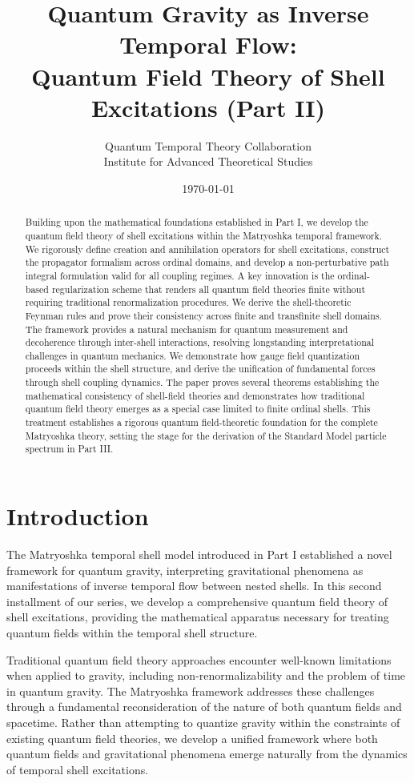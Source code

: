 \documentclass[12pt,a4paper]{article}
\title{Quantum Gravity as Inverse Temporal Flow: \\
Quantum Field Theory of Shell Excitations (Part II)}
\author{Quantum Temporal Theory Collaboration\\
Institute for Advanced Theoretical Studies}
\date{\today}
\begin{document}
\maketitle

\begin{abstract}
Building upon the mathematical foundations established in Part I, we develop the quantum field theory of shell excitations within the Matryoshka temporal framework. We rigorously define creation and annihilation operators for shell excitations, construct the propagator formalism across ordinal domains, and develop a non-perturbative path integral formulation valid for all coupling regimes. A key innovation is the ordinal-based regularization scheme that renders all quantum field theories finite without requiring traditional renormalization procedures. We derive the shell-theoretic Feynman rules and prove their consistency across finite and transfinite shell domains. The framework provides a natural mechanism for quantum measurement and decoherence through inter-shell interactions, resolving longstanding interpretational challenges in quantum mechanics. We demonstrate how gauge field quantization proceeds within the shell structure, and derive the unification of fundamental forces through shell coupling dynamics. The paper proves several theorems establishing the mathematical consistency of shell-field theories and demonstrates how traditional quantum field theory emerges as a special case limited to finite ordinal shells. This treatment establishes a rigorous quantum field-theoretic foundation for the complete Matryoshka theory, setting the stage for the derivation of the Standard Model particle spectrum in Part III.
\end{abstract}

\section{Introduction}

The Matryoshka temporal shell model introduced in Part I \cite{matryoshka-part1} established a novel framework for quantum gravity, interpreting gravitational phenomena as manifestations of inverse temporal flow between nested shells. In this second installment of our series, we develop a comprehensive quantum field theory of shell excitations, providing the mathematical apparatus necessary for treating quantum fields within the temporal shell structure.

Traditional quantum field theory approaches encounter well-known limitations when applied to gravity, including non-renormalizability and the problem of time in quantum gravity. The Matryoshka framework addresses these challenges through a fundamental reconsideration of the nature of both quantum fields and spacetime. Rather than attempting to quantize gravity within the constraints of existing quantum field theories, we develop a unified framework where both quantum fields and gravitational phenomena emerge naturally from the dynamics of temporal shell excitations.
\end{document}
